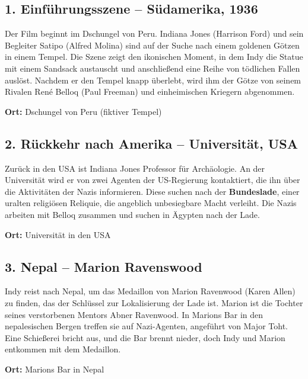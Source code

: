 \documentclass[a4paper]{article}
\begin{document}
\subsection*{1. Einführungsszene – Südamerika, 1936}
Der Film beginnt im Dschungel von Peru. Indiana Jones (Harrison Ford) und sein Begleiter Satipo (Alfred Molina) sind auf der Suche nach einem goldenen Götzen in einem Tempel. Die Szene zeigt den ikonischen Moment, in dem Indy die Statue mit einem Sandsack austauscht und anschließend eine Reihe von tödlichen Fallen auslöst. Nachdem er den Tempel knapp überlebt, wird ihm der Götze von seinem Rivalen René Belloq (Paul Freeman) und einheimischen Kriegern abgenommen.
\begin{itemize}
  \begin{item}
    \textbf{Ort:} Dschungel von Peru (fiktiver Tempel)
  \end{item}
\end{itemize}
\subsection*{2. Rückkehr nach Amerika – Universität, USA}
Zurück in den USA ist Indiana Jones Professor für Archäologie. An der Universität wird er von zwei Agenten der US-Regierung kontaktiert, die ihn über die Aktivitäten der Nazis informieren. Diese suchen nach der \textbf{Bundeslade}, einer uralten religiösen Reliquie, die angeblich unbesiegbare Macht verleiht. Die Nazis arbeiten mit Belloq zusammen und suchen in Ägypten nach der Lade.
\begin{itemize}
  \begin{item}
    \textbf{Ort:} Universität in den USA
  \end{item}
\end{itemize}
\subsection*{3. Nepal – Marion Ravenswood}
Indy reist nach Nepal, um das Medaillon von Marion Ravenwood (Karen Allen) zu finden, das der Schlüssel zur Lokalisierung der Lade ist. Marion ist die Tochter seines verstorbenen Mentors Abner Ravenwood. In Marions Bar in den nepalesischen Bergen treffen sie auf Nazi-Agenten, angeführt von Major Toht. Eine Schießerei bricht aus, und die Bar brennt nieder, doch Indy und Marion entkommen mit dem Medaillon.
\begin{itemize}
  \begin{item}
    \textbf{Ort:} Marions Bar in Nepal
  \end{item}
\end{itemize}
\end{document}
